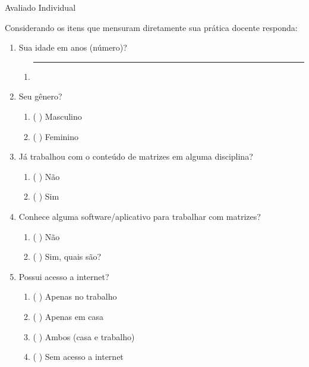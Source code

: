 \begin{apendicesenv}
\begin{center}
Avaliado Individual    
\end{center}


Considerando os itens que mensuram diretamente sua prática docente responda:




\begin{enumerate}

    \item Sua idade em anos (número)?
    \begin{enumerate}
        \item \rule{4cm}{.1pt}\\
    \end{enumerate}


    \item Seu gênero?
    \begin{enumerate}
        \item ( ) Masculino
        \item ( ) Feminino
    \end{enumerate}
    
    
    \item Já trabalhou com o conteúdo de matrizes em alguma disciplina?
    \begin{enumerate}
        \item ( ) Não
        \item ( ) Sim
    \end{enumerate}


    \item Conhece alguma software/aplicativo para trabalhar com matrizes?
    \begin{enumerate}
        \item ( ) Não
        \item ( ) Sim, quais são? \hrulefill \\
          
    \end{enumerate}


    \item Possui acesso a internet?
    \begin{enumerate}
        \item ( ) Apenas no trabalho
        \item ( ) Apenas em casa
        \item ( ) Ambos (casa e trabalho)
        \item ( ) Sem acesso a internet
    \end{enumerate}



\end{enumerate}
\end{apendicesenv}
